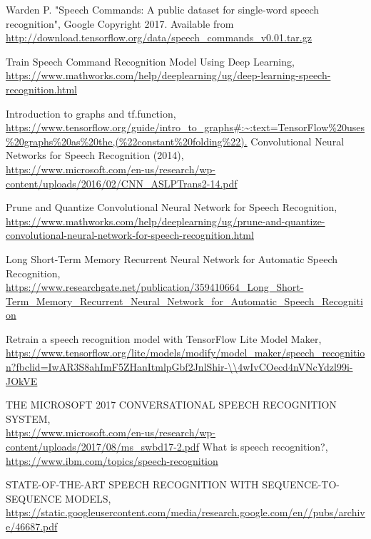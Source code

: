 \documentclass[a4paper]{report}
\begin{document}
{\begin{thebibliography}{10}
Warden P. "Speech Commands: A public dataset for single-word speech recognition", Google Copyright 2017. Available from\\
\url{http://download.tensorflow.org/data/speech_commands_v0.01.tar.gz}

    Train Speech Command Recognition Model Using Deep Learning,\\
\url{https://www.mathworks.com/help/deeplearning/ug/deep-learning-speech-recognition.html}

    Introduction to graphs and tf.function,\\
    \url{https://www.tensorflow.org/guide/intro_to_graphs#:~:text=TensorFlow\%20uses\%20graphs\%20as\%20the,(\%22constant\%20folding\%22).}
    Convolutional Neural Networks for Speech Recognition (2014),\\
    \url{https://www.microsoft.com/en-us/research/wp-content/uploads/2016/02/CNN_ASLPTrans2-14.pdf}

    Prune and Quantize Convolutional Neural Network for Speech Recognition,\\
\url{https://www.mathworks.com/help/deeplearning/ug/prune-and-quantize-convolutional-neural-network-for-speech-recognition.html}

    Long Short-Term Memory Recurrent Neural Network for Automatic Speech Recognition,\\
    \url{https://www.researchgate.net/publication/359410664_Long_Short-Term_Memory_Recurrent_Neural_Network_for_Automatic_Speech_Recognition}
    
    Retrain a speech recognition model with TensorFlow Lite Model Maker,\\
\url{https://www.tensorflow.org/lite/models/modify/model_maker/speech_recognition?fbclid=IwAR3S8ahImF5ZHanItmlpGbf2JnlShir-\\4wIvCOecd4nVNcYdzl99i-JOkVE}

    THE MICROSOFT 2017 CONVERSATIONAL SPEECH RECOGNITION SYSTEM,\\
    \url{https://www.microsoft.com/en-us/research/wp-content/uploads/2017/08/ms_swbd17-2.pdf}
    What is speech recognition?,\\
\url{https://www.ibm.com/topics/speech-recognition}

    STATE-OF-THE-ART SPEECH RECOGNITION WITH SEQUENCE-TO-SEQUENCE MODELS,\\
    \url{https://static.googleusercontent.com/media/research.google.com/en//pubs/archive/46687.pdf}
    

\end{thebibliography}}
\end{document}
